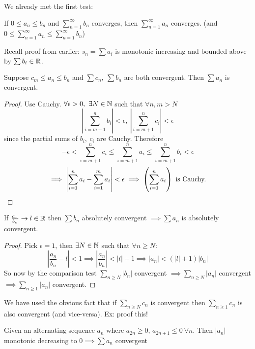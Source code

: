
\setcounter{equation}{4}
We already met the first test:
\begin{theorem}[Comparison I]
If $0 \leq a_n \leq b_n$ and $\sum_{n=1}^{\infty} b_n$ converges, then $\sum_{n=1}^{\infty} a_n$ converges.	 (and $0 \leq \sum_{n=1}^{\infty}a_n \leq \sum_{n=1}^{\infty}b_n$)
\end{theorem}

Recall proof from earlier: $s_n = \sum a_i$ is monotonic increasing and bounded above by $\sum b_i \in \mathbb{R}$.\\

\setcounter{equation}{17}
\begin{theorem}
	Suppose $c_m \leq a_n \leq b_n$ and $\sum c_n,~\sum b_n$ are both convergent. Then $\sum a_n$ is convergent.
\end{theorem}
\begin{proof}
Use Cauchy. $\forall \epsilon >0,~ \exists N \in \mathbb{N}$ such that $\forall n,m > N$
\[\left|\sum_{i=m+1}^n b_i\right| < \epsilon,~\left|\sum_{i=m+1}^n c_i\right| < \epsilon\] since the partial sums of $b_i,~c_i$ are Cauchy. Therefore
\[-\epsilon <\sum_{i=m+1}^n c_i \leq \sum_{i=m+1}^n a_i \leq \sum_{i=m+1}^n b_i < \epsilon   \]
\[\implies \left|\sum_{i=1}^{n} a_i - \sum_{i=1}^m a_i\right| < \epsilon \implies \left(\sum_{i=1}^{n} a_i \right) \text{ is Cauchy.} \qedhere\]
\end{proof}


\begin{theorem}
If $\frac{a_n}{b_n}\to l \in \mathbb{R}$ then $\sum b_n$ absolutely convergent $\implies \sum a_n$ is absolutely convergent.
\end{theorem}
\begin{proof}
Pick $\epsilon = 1$, then $\exists N \in \mathbb{N}$ such that $\forall n \geq N$:
\[\left|\frac{a_n}{b_n} - l \right| < 1 \implies \left|\frac{a_n}{b_n}\right| < |l| + 1 \implies |a_n| < (|l| + 1)|b_n|\]
So now by the comparison test $\sum_{n \geq N} |b_n|$ convergent $\implies \sum_{n \geq N} |a_n|$ convergent $\implies \sum_{n\geq 1} |a_n|$ convergent. 	
\end{proof}

We have used the obvious fact that if $\sum_{n \geq N} c_n$ is convergent then $\sum_{n \geq 1} c_n$ is also convergent (and vice-versa). Ex: proof this!\\

\begin{theorem}
Given an alternating sequence $a_n$ where $a_{2n} \geq 0$, $a_{2n+1} \leq 0~ \forall n$. Then $|a_n|$ monotonic decreasing to $0 \implies \sum a_n$ convergent
\end{theorem}

